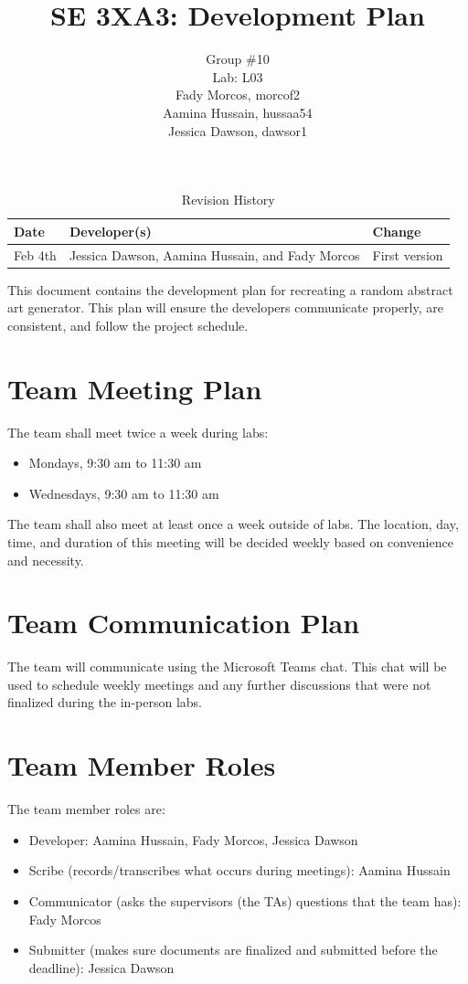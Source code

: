 \documentclass{article}
\title{SE 3XA3: Development Plan}
\author{Group \#10
        \\Lab: L03
		\\ Fady Morcos, morcof2
		\\ Aamina Hussain, hussaa54
		\\ Jessica Dawson, dawsor1
}
\date{}
\begin{document}
\begin{table}[hp]
\caption{Revision History} \label{TblRevisionHistory}
\begin{tabularx}{\textwidth}{llX}
\toprule
\textbf{Date} & \textbf{Developer(s)} & \textbf{Change}\\
\midrule
Feb 4th & Jessica Dawson, Aamina Hussain, and Fady Morcos & First version\\
\bottomrule
\end{tabularx}
\end{table}

\newpage


\maketitle

This document contains the development plan for recreating a random abstract art generator. This plan will ensure the developers communicate properly, are consistent, and follow the project schedule.

\section{Team Meeting Plan}

The team shall meet twice a week during labs:
\begin{itemize}
    \item Mondays, 9:30 am to 11:30 am
    \item Wednesdays, 9:30 am to 11:30 am
\end{itemize}
The team shall also meet at least once a week outside of labs. The location, day, time, and duration of this meeting will be decided weekly based on convenience and necessity.

\section{Team Communication Plan}

The team will communicate using the Microsoft Teams chat. This chat will be used to schedule weekly meetings and any further discussions that were not finalized during the in-person labs.

\section{Team Member Roles}

The team member roles are:
\begin{itemize}
    \item Developer: Aamina Hussain, Fady Morcos, Jessica Dawson
    \item Scribe (records/transcribes what occurs during meetings): Aamina Hussain
    \item Communicator (asks the supervisors (the TAs) questions that the team has): Fady Morcos
    \item Submitter (makes sure documents are finalized and submitted before the deadline): Jessica Dawson
\end{itemize}
\end{document}
